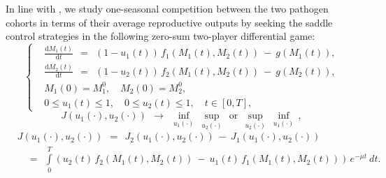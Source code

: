 \documentclass[11pt]{amsart}
\begin{document}
In line with \cite{YegorovGrognardMailleretHalkettBernhard2019,
BernhardGrognardMailleretAkhmetzhanov2010},
we study one-seasonal competition between the two pathogen cohorts in terms of
their average reproductive outputs by
seeking the saddle control strategies in the following zero-sum two-player
differential game:
\begin{equation}
\left\{ \begin{aligned}
& \frac{\mathrm{d} M_1(t)}{\mathrm{d} t} \:\: = \:\: (1 - u_1(t)) \,
  f_1(M_1(t), M_2(t)) \: - \: g(M_1(t)), \\
& \frac{\mathrm{d} M_2(t)}{\mathrm{d} t} \:\: = \:\: (1 - u_2(t)) \,
  f_2(M_1(t), M_2(t)) \: - \: g(M_2(t)), \\
& M_1(0) = M_1^0, \quad M_2(0) = M_2^0, \\
& 0 \leqslant u_1(t) \leqslant 1, \quad 0 \leqslant u_2(t) \leqslant 1,
  \quad t \in [0, T],
\end{aligned} \right.  \label{7}
\end{equation}
\begin{equation}
J(u_1(\cdot), u_2(\cdot)) \:\: \longrightarrow \:\: \inf_{u_1(\cdot)} \:
  \sup_{u_2(\cdot)} \:\: \mbox{or} \:\:
\sup_{u_2(\cdot)} \: \inf_{u_1(\cdot)} \, ,  \label{8}
\end{equation}
\begin{equation}
\begin{aligned}
& J(u_1(\cdot), u_2(\cdot)) \:\: = \:\: J_2(u_1(\cdot), u_2(\cdot)) \: - \:
J_1(u_1(\cdot), u_2(\cdot)) \\
& \quad
= \:\: \int\limits_0^T \left( u_2(t) \, f_2(M_1(t), M_2(t)) \: - \: u_1(t)
  \, f_1(M_1(t), M_2(t)) \right) \,
e^{-\mu t} \: dt.
\end{aligned}  \label{9}
\end{equation}
\end{document}
